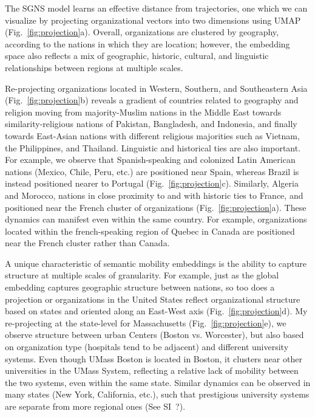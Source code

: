 \documentclass[12pt]{article} %
\begin{document}
The SGNS model learns an effective distance from trajectories, one which we can visualize by projecting organizational vectors into two dimensions using UMAP \autocite{mcinnes2018umap} (Fig.~\ref{fig:projection}a).
Overall, organizations are clustered by geography, according to the nations in which they are location;
however, the embedding space also reflects a mix of geographic, historic, cultural, and linguistic relationships between regions at multiple scales.

Re-projecting organizations located in Western, Southern, and Southeastern Asia (Fig.~\ref{fig:projection}b) reveals a gradient of countries related to geography and religion moving from majority-Muslim nations in the Middle East towards similarity-religious nations of Pakistan, Bangladesh, and Indonesia, and finally towards East-Asian nations with different religious majorities such as Vietnam, the Philippines, and Thailand. 
Linguistic and historical ties are also important. 
For example, we observe that Spanish-speaking and colonized Latin American nations (Mexico, Chile, Peru, etc.) are positioned near Spain, whereas Brazil is instead positioned nearer to Portugal (Fig.~\ref{fig:projection}c). 
Similarly, Algeria and Morocco, nations in close proximity to and with historic ties to France, and positioned near the French cluster of organizations (Fig.~\ref{fig:projection}a). 
These dynamics can manifest even within the same country. 
For example, organizations located within the french-speaking region of Quebec in Canada are positioned near the French cluster rather than Canada.

A unique characteristic of semantic mobility embeddings is the ability to capture structure at multiple scales of granularity.
For example, just as the global embedding captures geographic structure between nations, so too does a projection or organizations in the United States reflect organizational structure based on states and oriented along an East-West axis (Fig.~\ref{fig:projection}d). 
My re-projecting at the state-level for Massachusetts (Fig.~\ref{fig:projection}e), we observe structure between urban Centers (Boston vs. Worcester), but also based on organization type (hospitals tend to be adjacent) and different university systems. Even though UMass Boston is located in Boston, it clusters near other universities in the UMass System, reflecting a relative lack of mobility between the two systems, even within the same state. 
Similar dynamics can be observed in many states (New York, California, etc.), such that prestigious university systems are separate from more regional ones (See SI~?).
\end{document}
